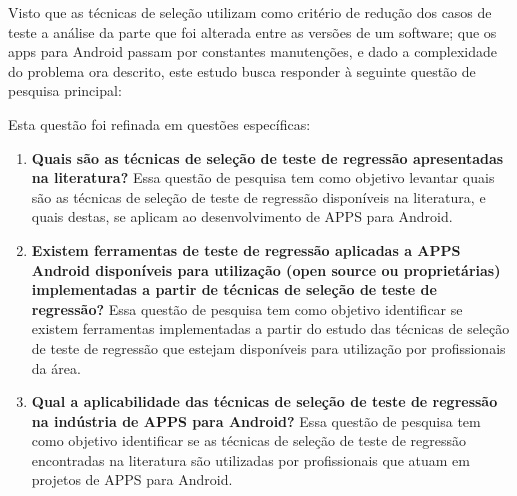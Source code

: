Visto que as técnicas de seleção utilizam como critério de redução dos casos de teste a análise da parte que foi alterada entre as versões de um software; que os apps para Android passam por constantes manutenções, e dado a complexidade do problema ora descrito, este estudo busca responder à seguinte questão de pesquisa principal:
\begin{center}
    \noindent{}
\end{center}

\vspace{.5em}
Esta questão foi refinada em questões específicas:
\vspace{.5em}

\begin{enumerate}[label=\bf QP\arabic*,leftmargin=1.8cm]

\item \textbf{Quais são as técnicas de seleção de teste de regressão apresentadas na literatura?} Essa questão de pesquisa tem como objetivo levantar quais são as técnicas de seleção de teste de regressão disponíveis na literatura, e quais destas, se aplicam ao desenvolvimento de \ac{APPS} para Android.

    
\item \textbf{Existem ferramentas de teste de regressão aplicadas a \ac{APPS} Android disponíveis para utilização (open source ou proprietárias) implementadas a partir de técnicas de seleção de teste de regressão?} Essa questão de pesquisa tem como objetivo identificar se existem ferramentas implementadas a partir do estudo das técnicas de seleção de teste de regressão que estejam disponíveis para utilização por profissionais da área.

\item \textbf{Qual a aplicabilidade das técnicas de seleção de teste de regressão na indústria de \ac{APPS} para Android?} Essa questão de pesquisa tem como objetivo identificar se as técnicas de seleção de teste de regressão encontradas na literatura são utilizadas por profissionais que atuam em projetos de \ac{APPS} para Android.


\end{enumerate}

